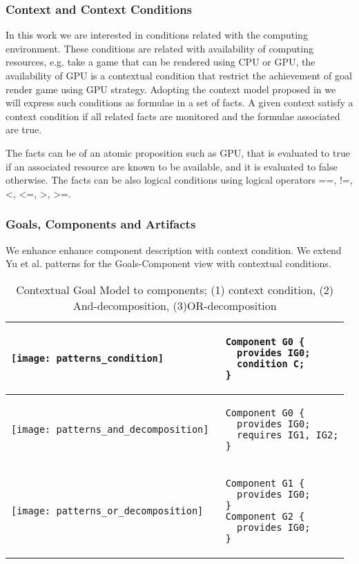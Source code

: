 \subsubsection{Context and Context Conditions}
\label{context}

In this work we are interested in conditions related with the computing environment. These conditions are related with availability of computing resources, e.g. take a game that can be rendered using CPU or GPU, the availability of GPU is a contextual condition that restrict the achievement of goal render game using GPU strategy.
Adopting the context model proposed in \cite{ali_goal-based_2010} we will express such conditions as formulae in a set of facts. A given context satisfy a context condition if all related facts are monitored and the formulae associated are true.

The facts can be of an atomic proposition such as GPU, that is evaluated to true if an associated resource are known to be available, and it is evaluated to false otherwise.
The facts can be also logical conditions using logical operators ==, !=, <, <=, >, >=.


\subsubsection{Goals, Components and Artifacts}
\label{sec:rules}

We enhance enhance component description with context condition. We extend Yu et al.\cite{yu_goals_2008} patterns for the Goals-Component view with contextual conditions.

\begin{table}[]
\centering
\caption{Contextual Goal Model to components; (1) context condition, (2) And-decomposition, (3)OR-decomposition}
\label{table_related_works}
\begin{tabular}{|l|l|}
\hline
 \texttt{[image: patterns\_condition]} &
 \begin{lstlisting}
 Component G0 {
   provides IG0;
   condition C;
 }
 \end{lstlisting} \\ \hline
 \texttt{[image: patterns\_and\_decomposition]} &
 \begin{lstlisting}
 Component G0 {
   provides IG0;
   requires IG1, IG2;
 }
 \end{lstlisting} \\ \hline
 \texttt{[image: patterns\_or\_decomposition]} &
 \begin{lstlisting}
 Component G1 {
   provides IG0;
 }
 Component G2 {
   provides IG0;
 }
 \end{lstlisting} \\ \hline
\end{tabular}
\end{table}

